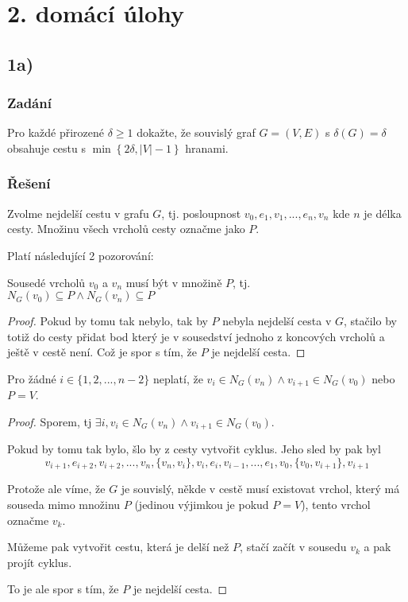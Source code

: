 \documentclass[../main.tex]{subfiles}
\begin{document}
\section{2. domácí úlohy}

\subsection{1a)}
\subsubsection*{Zadání}
Pro každé přirozené $\delta\geq1$ dokažte, že souvislý graf
$G=(V,E)$ s $\delta(G) = \delta$ obsahuje cestu s $\min\left\{2\delta, |V| - 1\right\}$
hranami.

\subsubsection*{Řešení}

Zvolme nejdelší cestu v grafu $G$, tj. posloupnost $v_0, e_1, v_1, ..., e_n, v_n$
kde $n$ je délka cesty. Množinu všech vrcholů cesty označme jako $P$.

Platí následující 2 pozorování:

\begin{lemma*}
    Sousedé vrcholů $v_0$ a $v_n$ musí být v množině $P$, tj.\\ $N_G(v_0) \subseteq P \wedge N_G(v_n) \subseteq P$
\end{lemma*}

\begin{proof}
    Pokud by tomu tak nebylo, tak by $P$ nebyla nejdelší cesta v $G$, 
    stačilo by totiž do cesty přidat bod který je v sousedství jednoho z koncových vrcholů a ještě v cestě není.
    Což je spor s tím, že $P$ je nejdelší cesta.
\end{proof}


\begin{lemma*}
    Pro žádné $i\in\{  1,2,...,n-2 \}$ neplatí, že $v_i \in N_G(v_n) \wedge v_{i+1} \in N_G(v_0)$ nebo $P = V$.
\end{lemma*}
\begin{proof}
    Sporem, tj $\exists i, v_i \in N_G(v_n) \wedge v_{i+1} \in N_G(v_0)$.

    Pokud by tomu tak bylo, šlo by z cesty vytvořit cyklus. Jeho sled by pak byl  
    \begin{equation*}
        v_{i+1}, e_{i+2}, v_{i+2}, ..., v_n, \{v_n, v_i\}, v_i, e_i, v_{i-1}, ..., e_{1}, v_0, \{v_0, v_{i+1}\}, v_{i+1}
    \end{equation*}

    Protože ale víme, že $G$ je souvislý, někde v cestě musí existovat vrchol, 
    který má souseda mimo množinu $P$ (jedinou výjimkou je pokud $P = V$), tento vrchol označme $v_k$.
    
    Můžeme pak vytvořit cestu, která je delší než $P$, stačí začít v sousedu $v_k$ a pak projít cyklus.
    
    To je ale spor s tím, že $P$ je nejdelší cesta. 
\end{proof}
\end{document}
